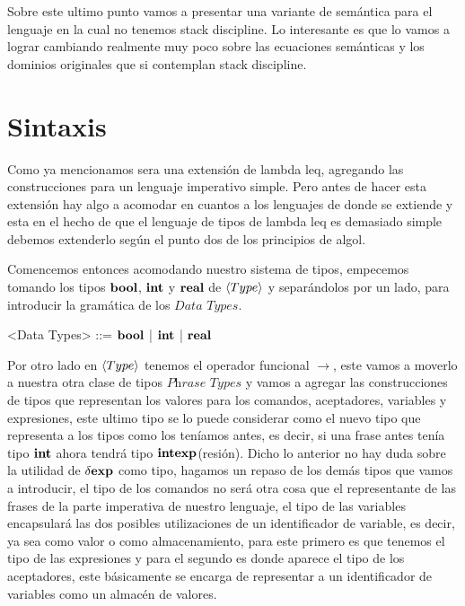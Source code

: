 Sobre este ultimo punto vamos a presentar una variante de sem\'antica para el lenguaje
en la cual no tenemos stack discipline. Lo interesante es que lo vamos a lograr cambiando
realmente muy poco sobre las ecuaciones sem\'anticas y los dominios originales que
si contemplan stack discipline.

\section{Sintaxis}

Como ya mencionamos \Alike sera una extensi\'on de lambda leq, agregando las
construcciones para un lenguaje imperativo simple. Pero antes de hacer esta extensi\'on
hay algo a acomodar en cuantos a los lenguajes de donde se extiende \Alike y
esta en el hecho de que el lenguaje de tipos de lambda leq es demasiado simple debemos
extenderlo seg\'un el punto dos de los principios de algol.

Comencemos entonces acomodando nuestro sistema de tipos, empecemos tomando los tipos
$\textbf{bool}$, $\textbf{int}$ y $\textbf{real}$ de $\langle Type \rangle$ y separándolos por un lado, para
introducir la gram\'atica de los  $\textit{Data Types}$.

\setlength{\grammarindent}{6em}
\begin{grammar}

<Data Types> ::= $\textbf{bool}$ | $\textbf{int}$ | $\textbf{real}$

\end{grammar}

Por otro lado en $\langle Type \rangle$ tenemos el operador funcional $\rightarrow$, este vamos 
a moverlo a nuestra otra clase de tipos $\textit{Phrase Types}$ y vamos a agregar las
construcciones de tipos que representan los valores para los comandos, aceptadores, variables y 
expresiones, este ultimo tipo se lo puede considerar como el nuevo tipo que 
representa a los tipos como los ten\'iamos antes, es decir, si una frase antes
ten\'ia tipo $\textbf{int}$ ahora tendr\'a tipo $\textbf{int}\textbf{exp}$(resi\'on). Dicho lo
anterior no hay duda sobre la utilidad de $\delta \textbf{exp}$ como tipo, hagamos un repaso
de los dem\'as tipos que vamos a introducir, el tipo de los comandos no ser\'a
otra cosa que el representante de las frases de la parte imperativa de
nuestro lenguaje, el tipo de las variables encapsular\'a las dos posibles utilizaciones
de un identificador de variable, es decir, ya sea como valor o como almacenamiento,
para este primero es que tenemos el tipo de las expresiones y para el segundo es
donde aparece el tipo de los aceptadores, este b\'asicamente se encarga de 
representar a un identificador de variables como un almac\'en de valores.

